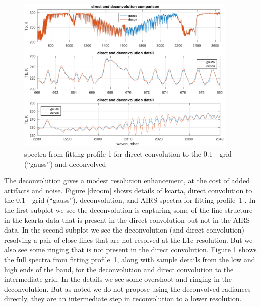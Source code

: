\documentclass[11pt]{article}
\begin{document}
\begin{figure} %
  \centering
  \includegraphics[height=7.5cm]{figures/airs_decon_spec.pdf}
  \caption{spectra from fitting profile 1 for direct convolution to
    the $0.1$~\wn\ grid (``gauss'') and deconvolved {\airs}}
  \label{dspec}
\end{figure}


The {\airs} deconvolution gives a modest resolution enhancement, at
the cost of added artifacts and noise.  Figure \ref{dzoom} shows
details of kcarta, direct convolution to the $0.1$~\wn\ grid
(``gauss''), deconvolution, and AIRS spectra for fitting profile~1
\cite{sarta1,sarta2}.  In the first subplot we see the deconvolution
is capturing some of the fine structure in the kcarta data that is
present in the direct convolution but not in the AIRS data.  In the
second subplot we see the deconvolution (and direct convolution)
resolving a pair of close lines that are not resolved at the {\airs}
L1c resolution.  But we also see some ringing that is not present in
the direct convolution.  Figure \ref{dspec} shows the full spectra
from fitting profile~1, along with sample details from the low and
high ends of the band, for the deconvolution and direct convolution
to the intermediate grid.  In the details we see some overshoot and
ringing in the deconvolution.  But as noted we do not propose using
the deconvolved radiances directly, they are an intermediate step in
reconvolution to a lower resolution.
\end{document}

